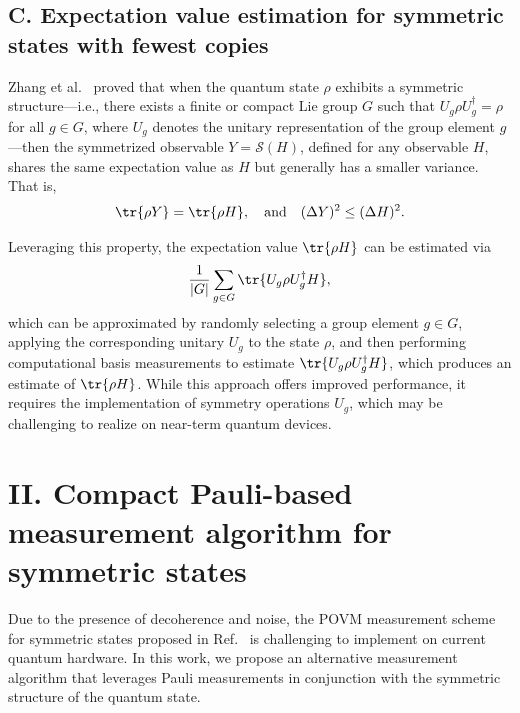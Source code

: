 \documentclass[prl,aps,notitlepage,superscriptaddress,showpacs,nofootinbib]{revtex4-2}
\begin{document}
\subsection{C. Expectation value estimation for symmetric states with fewest copies}


Zhang et al.~\cite{zhang2024inferring} proved that when the quantum state $\rho$ exhibits a symmetric structure—i.e., there exists a finite or compact Lie group $G$ such that $U_g \rho U_g^\dagger = \rho$ for all $g \in G$, where $U_g$ denotes the unitary representation of the group element $g$—then the symmetrized observable $Y = \mathcal{S}(H)$, defined for any observable $H$, shares the same expectation value as $H$ but generally has a smaller variance. That is,
\begin{equation}
 \tr{\rho Y} = \tr{\rho H}, \quad \text{and} \quad (\Delta Y)^2 \leq (\Delta H)^2.   
\end{equation}

Leveraging this property, the expectation value $\tr{\rho H}$ can be estimated via
\begin{equation}
    \frac{1}{|G|} \sum_{g \in G} \tr{U_g \rho U_g^\dagger H},
\end{equation}
which can be approximated by randomly selecting a group element $g \in G$, applying the corresponding unitary $U_g$ to the state $\rho$, and then performing computational basis measurements to estimate $\tr{U_g \rho U_g^\dagger H}$, which produces an estimate of $\tr{\rho H}$. While this approach offers improved performance, it requires the implementation of symmetry operations $U_g$, which may be challenging to realize on near-term quantum devices.


\section{II. Compact Pauli-based measurement algorithm for symmetric states}

Due to the presence of decoherence and noise, the POVM measurement scheme for symmetric states proposed in Ref.~\cite{zhang2024inferring} is challenging to implement on current quantum hardware. In this work, we propose an alternative measurement algorithm that leverages Pauli measurements in conjunction with the symmetric structure of the quantum state. 
\end{document}
